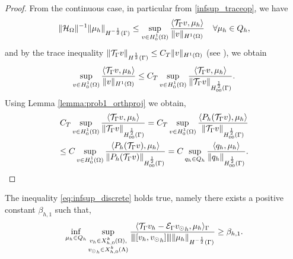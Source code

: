 \documentclass[r]{siamart171218}
\begin{document}
\begin{proof}
From the continuous case, in particular from \eqref{infsup_traceop}, we have
\begin{equation*}
\|\mathcal{H}_\Omega\|^{-1} \|\mu_h\|_{H^{-\frac 12}(\Gamma)} \leq \sup_{\substack{v \in H^1_0(\Omega)}} \frac{\langle {\mathcal{T}_\Gamma} v , \mu_h \rangle}{\|v\|_{H^1(\Omega)}} 
\quad \forall \mu_h \in Q_h,
\end{equation*}
and by the trace inequality $\|{\mathcal{T}_\Gamma} v\|_{H^\frac 12 (\Gamma)} \leq C_T \|v\|_{H^1(\Omega)}$ (see \cite[7.56]{adams1975pure}), we obtain 
\begin{equation*}
\sup_{\substack{v \in H^1_0(\Omega)}} \frac{\langle {\mathcal{T}_\Gamma} v , \mu_h \rangle}{\|v\|_{H^1(\Omega)}}
\leq C_T \sup_{\substack{v \in H^1_0(\Omega)}} \frac{\langle {\mathcal{T}_\Gamma} v , \mu_h \rangle}{ \|{\mathcal{T}_\Gamma} v\|_{H^{\frac 12}_{00}(\Gamma)}}.
\end{equation*}
Using Lemma \ref{lemma:prob1_orthproj} we obtain,
\begin{multline*}
C_T \sup_{\substack{v \in H^1_0(\Omega)}} \frac{\langle {\mathcal{T}_\Gamma} v , \mu_h \rangle}{ \|{\mathcal{T}_\Gamma} v\|_{H^{\frac 12}_{00}(\Gamma)}}= C_T \sup_{\substack{v \in H^1_0(\Omega)}} \frac{\langle P_h({\mathcal{T}_\Gamma} v) , \mu_h \rangle}{ \|{\mathcal{T}_\Gamma} v\|_{H^{\frac 12}_{00}(\Gamma)}}
\\
\leq  C \sup_{\substack{v \in H^1_0(\Omega)}} \frac{\langle P_h({\mathcal{T}_\Gamma} v) , \mu_h \rangle}{ \|P_h({\mathcal{T}_\Gamma} v)\|_{H^{\frac 12}_{00}(\Gamma)}}
= C \sup_{\substack{q_h \in Q_h}} \frac{\langle q_h , \mu_h \rangle}{  \|q_h\|_{H^{\frac 12}_{00}(\Gamma)}}.
\end{multline*}
\end{proof}

\begin{theorem} The inequality \eqref{eq:infsup_discrete} holds true, 
namely there exists a positive constant $\beta_{h,1}$ such that,
\begin{equation}\label{inf_sup_discrete_prob1}
\inf_{\mu_h \in Q_h} 
\sup_{\substack{v_h \in X_{h,0}^k(\Omega),\\ {\vd}_h \in X_{h,0}^k(\Lambda)}} \frac{ \langle \trace v_h - \ext {\vd}_h, \mu_h \rangle _{\Gamma}} {\vertiii{[v_h, {\vd} _h]} \|\mu_h\|_{H^{-\frac 12 }(\Gamma)}}
\geq \beta_{h,1}. 
\end{equation}
\end{theorem}
\end{document}
